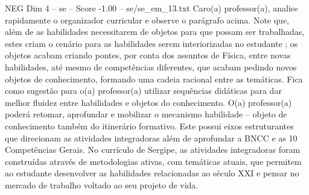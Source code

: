 \begin{textsample}{NEG Dim 4 – se – Score -1.00 – se/se\_em\_13.txt}
Caro(a) professor(a), analise rapidamente o organizador curricular e observe o parágrafo acima.
Note que, além de as habilidades necessitarem de objetos para que possam ser trabalhadas, estes criam o cenário para as habilidades serem interiorizadas no estudante ; os objetos acabam criando pontes, por conta dos assuntos de Física, entre novas habilidades, até mesmo de competências diferentes, que acabam pedindo novos objetos de conhecimento, formando uma cadeia racional entre as temáticas.
Fica como sugestão para o(a) professor(a) utilizar sequências didáticas para dar melhor fluidez entre habilidades e objetos do conhecimento.
O(a) professor(a) poderá retomar, aprofundar e mobilizar o mecanismo habilidade – objeto de conhecimento também do itinerário formativo.
Este possui eixos estruturantes que direcionam as atividades integradoras além de aprofundar a BNCC e as 10 Competências Gerais.
No currículo de Sergipe, as atividades integradoras foram construídas através de metodologias ativas, com temáticas atuais, que permitem ao estudante desenvolver as habilidades relacionadas ao século XXI e pensar no mercado de trabalho voltado ao seu projeto de vida.

\end{textsample}
